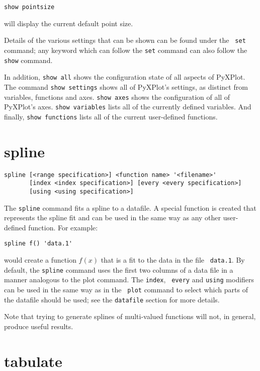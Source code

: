 \begin{verbatim}
show pointsize
\end{verbatim}

\noindent will display the current default point size.

Details of the various settings that can be shown can be found under the {\tt
set} command; any keyword which can follow the {\tt set} command can also follow
the {\tt show} command.

In addition, {\tt show all} shows the configuration state of all aspects of
PyXPlot. The command {\tt show settings} shows all of PyXPlot's settings, as
distinct from variables, functions and axes. {\tt show axes} shows the
configuration of all of PyXPlot's axes. {\tt show variables} lists all of the
currently defined variables. And finally, {\tt show functions} lists all of the
current user-defined functions.


\section{spline}

\begin{verbatim}
spline [<range specification>] <function name> '<filename>' 
       [index <index specification>] [every <every specification>]
       [using <using specification>]
\end{verbatim}

The {\tt spline} command fits a spline to a datafile. A special function is
created that represents the spline fit and can be used in the same way as any
other user-defined function. For example:

\begin{verbatim}
spline f() 'data.1'
\end{verbatim}

\noindent would create a function $f(x)$ that is a fit to the data in the file {\tt
data.1}. By default, the {\tt spline} command uses the first two columns of a
data file in a manner analogous to the plot command. The {\tt index}, {\tt
every} and {\tt using} modifiers can be used in the same way as in the {\tt
plot} command to select which parts of the datafile should be used; see the
{\tt datafile} section for more details.

Note that trying to generate splines of multi-valued functions will not, in
general, produce useful results.

\section{tabulate}

